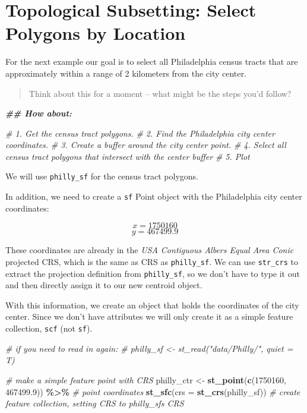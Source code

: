 \documentclass[
]{book}
\newenvironment{Shaded}{\begin{snugshade}}{\end{snugshade}}
\newcommand{\AttributeTok}[1]{\textcolor[rgb]{0.13,0.29,0.53}{#1}}
\newcommand{\CommentTok}[1]{\textcolor[rgb]{0.56,0.35,0.01}{\textit{#1}}}
\newcommand{\DecValTok}[1]{\textcolor[rgb]{0.00,0.00,0.81}{#1}}
\newcommand{\DocumentationTok}[1]{\textcolor[rgb]{0.56,0.35,0.01}{\textbf{\textit{#1}}}}
\newcommand{\FloatTok}[1]{\textcolor[rgb]{0.00,0.00,0.81}{#1}}
\newcommand{\FunctionTok}[1]{\textcolor[rgb]{0.13,0.29,0.53}{\textbf{#1}}}
\newcommand{\NormalTok}[1]{#1}
\newcommand{\OtherTok}[1]{\textcolor[rgb]{0.56,0.35,0.01}{#1}}
\newcommand{\SpecialCharTok}[1]{\textcolor[rgb]{0.81,0.36,0.00}{\textbf{#1}}}
\begin{document}
\section{Topological Subsetting: Select Polygons by Location}\label{topological-subsetting-select-polygons-by-location}

For the next example our goal is to select all Philadelphia census tracts that are approximately within a range of 2 kilometers from the city center.

\begin{quote}
Think about this for a moment -- what might be the steps you'd follow?
\end{quote}

\begin{Shaded}
\begin{Highlighting}[]
\DocumentationTok{\#\# How about:}

\CommentTok{\# 1. Get the census tract polygons.}
\CommentTok{\# 2. Find the Philadelphia city center coordinates.}
\CommentTok{\# 3. Create a buffer around the city center point.}
\CommentTok{\# 4. Select all census tract polygons that intersect with the center buffer}
\CommentTok{\# 5. Plot}
\end{Highlighting}
\end{Shaded}

We will use \texttt{philly\_sf} for the census tract polygons.

In addition, we need to create a \texttt{sf} Point object with the Philadelphia city center coordinates:

\[x = 1750160\]
\[y = 467499.9\]

These coordinates are already in the \emph{USA Contiguous Albers Equal Area Conic} projected CRS, which is the same as CRS as \texttt{philly\_sf}. We can use \texttt{str\_crs} to extract the projection definition from \texttt{philly\_sf}, so we don't have to type it out and then directly assign it to our new centroid object.

With this information, we create an object that holds the coordinates of the city center. Since we don't have attributes we will only create it as a simple feature collection, \texttt{scf} (not \texttt{sf}).

\begin{Shaded}
\begin{Highlighting}[]
\CommentTok{\# if you need to read in again:}
\CommentTok{\# philly\_sf \textless{}{-} st\_read("data/Philly/", quiet = T)}

\CommentTok{\# make a simple feature point with CRS}
\NormalTok{philly\_ctr }\OtherTok{\textless{}{-}} 
  \FunctionTok{st\_point}\NormalTok{(}\FunctionTok{c}\NormalTok{(}\DecValTok{1750160}\NormalTok{, }\FloatTok{467499.9}\NormalTok{)) }\SpecialCharTok{\%\textgreater{}\%} \CommentTok{\# point coordinates}
  \FunctionTok{st\_sfc}\NormalTok{(}\AttributeTok{crs =} \FunctionTok{st\_crs}\NormalTok{(philly\_sf))  }\CommentTok{\# create feature collection, setting CRS to philly\_sf\textquotesingle{}s CRS}
\end{Highlighting}
\end{Shaded}
\end{document}
